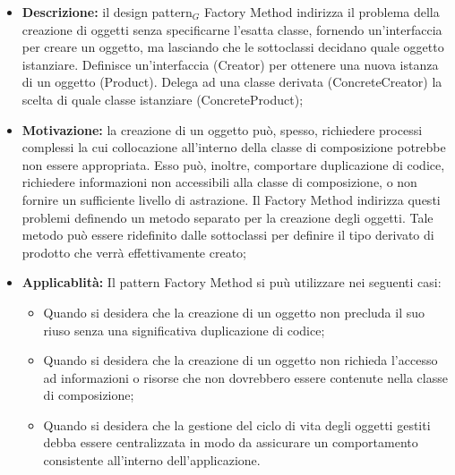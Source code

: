 \begin{itemize}
\item \textbf{Descrizione:} il design pattern$_G$ Factory Method indirizza il problema della creazione di oggetti senza specificarne l’esatta classe, fornendo un’interfaccia per creare un oggetto, ma lasciando che le sottoclassi decidano quale oggetto istanziare. Definisce un’interfaccia (Creator) per ottenere una nuova istanza di un oggetto (Product).
Delega ad una classe derivata (ConcreteCreator) la scelta di quale classe istanziare (ConcreteProduct);
\item \textbf{Motivazione:} la creazione di un oggetto può, spesso, richiedere processi complessi la cui collocazione all’interno della classe di composizione potrebbe non essere appropriata.
Esso può, inoltre, comportare duplicazione di codice, richiedere informazioni non accessibili alla classe di composizione, o non fornire un sufficiente livello di astrazione.
Il Factory Method indirizza questi problemi definendo un metodo separato per la creazione degli oggetti. Tale metodo può essere ridefinito dalle sottoclassi per definire il tipo derivato di prodotto che verrà effettivamente creato;
\item \textbf{Applicablità:} Il pattern Factory Method si puù utilizzare nei seguenti casi:

\begin{itemize}
\item Quando si desidera che la creazione di un oggetto non precluda il suo riuso senza una significativa duplicazione di codice;
\item Quando si desidera che la creazione di un oggetto non richieda l’accesso ad informazioni o risorse che non dovrebbero essere contenute nella classe di composizione;
\item Quando si desidera che la gestione del ciclo di vita degli oggetti gestiti debba essere centralizzata in modo da assicurare un comportamento consistente all’interno dell’applicazione.
\end{itemize} 

\end{itemize}

\newpage